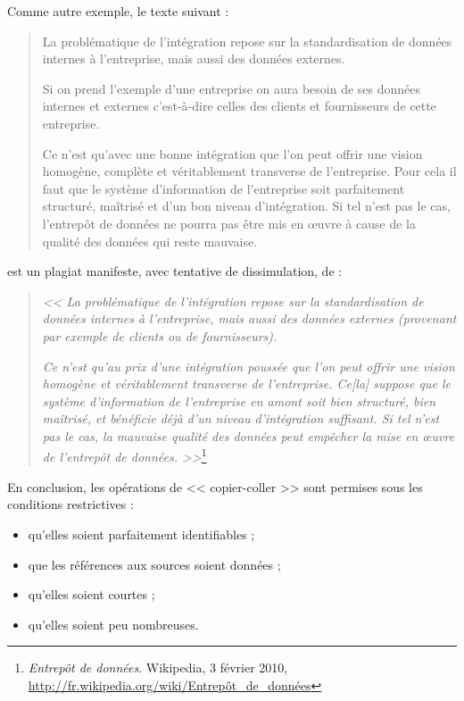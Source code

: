 \documentclass[11pt, french]{report-rd-info}
\begin{document}
Comme autre exemple, le texte suivant :
\begin{quote}
La problématique de l'intégration repose sur la standardisation de données internes à l'entreprise, mais aussi des données externes.

Si on prend l'exemple d'une entreprise on aura besoin de ses données internes et externes c'est-à-dire celles des clients et fournisseurs de cette entreprise.

Ce n'est qu'avec une bonne intégration que l'on peut offrir une vision homogène, complète et véritablement transverse de l'entreprise. Pour cela il faut que le système d'information de l'entreprise soit parfaitement structuré, maîtrisé et d'un bon niveau d'intégration. Si tel n'est pas le cas, l'entrepôt de données ne pourra pas être mis en \oe uvre à cause de la qualité des données qui reste mauvaise.
\end{quote}
est un plagiat manifeste, avec tentative de dissimulation, de :
\begin{quote}
\emph{<< La problématique de l'intégration repose sur la standardisation de données internes à l'entreprise, mais aussi des données externes (provenant par exemple de clients ou de fournisseurs).}

\emph{Ce n'est qu'au prix d'une intégration poussée que l'on peut offrir une vision homogène et véritablement transverse de l'entreprise. Ce[la] suppose que le système d'information de l'entreprise en amont soit bien structuré, bien maîtrisé, et bénéficie déjà d'un niveau d'intégration suffisant. Si tel n'est pas le cas, la mauvaise qualité des données peut empêcher la mise en \oe uvre de l'entrepôt de données. >>}\footnote{\emph{Entrepôt de données}. Wikipedia, 3 février 2010, \url{http://fr.wikipedia.org/wiki/Entrepôt_de_données}}
\end{quote}

\vspace{2\baselineskip}

En conclusion, les opérations de << copier-coller >> sont permises sous les conditions restrictives :
\begin{itemize}
	\item qu'elles soient parfaitement identifiables ;
	\item que les références aux sources soient données ;
	\item qu'elles soient courtes ;
	\item qu'elles soient peu nombreuses.
\end{itemize}
\end{document}
